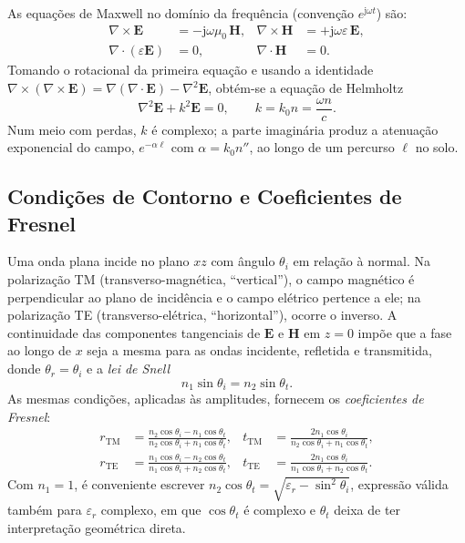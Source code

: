 \documentclass[12pt,a4paper,oneside]{book}
\theoremstyle{remark}
\newcommand{\vect}[1]{\boldsymbol{#1}}
\newcommand{\jj}{\mathrm{j}}
\theoremstyle{plain}
\theoremstyle{definition}
\begin{document}
As equações de Maxwell no domínio da frequência (convenção $e^{\jj\omega t}$)
são:
\begin{align}
  \nabla \times \vect{E} &= -\jj\omega\mu_0\,\vect{H}, \label{eq:maxwell_rot_e} &
  \nabla \times \vect{H} &= +\jj\omega\varepsilon\,\vect{E}, \\
  \nabla \cdot (\varepsilon\vect{E}) &= 0, \label{eq:maxwell_div_e} &
  \nabla \cdot \vect{H} &= 0 .
\end{align}
Tomando o rotacional da primeira equação e usando a identidade
$\nabla\times(\nabla\times\vect{E}) = \nabla(\nabla\cdot\vect{E}) - \nabla^2\vect{E}$,
obtém-se a equação de Helmholtz
\begin{equation}
  \nabla^2 \vect{E} + k^2 \vect{E} = 0, \qquad k = k_0 n = \frac{\omega n}{c}.
  \label{eq:helmholtz}
\end{equation}
Num meio com perdas, $k$ é complexo; a parte imaginária produz a atenuação
exponencial do campo, $e^{-\alpha\ell}$ com $\alpha = k_0 n''$, ao longo de um
percurso $\ell$ no solo.

\subsection{Condições de Contorno e Coeficientes de Fresnel}
\label{ssec:fresnel}

Uma onda plana incide no plano $xz$ com ângulo $\theta_i$ em relação à normal.
Na polarização TM (transverso-magnética, ``vertical''), o campo magnético é
perpendicular ao plano de incidência e o campo elétrico pertence a ele; na
polarização TE (transverso-elétrica, ``horizontal''), ocorre o inverso. A
continuidade das componentes tangenciais de $\vect E$ e $\vect H$ em $z=0$
impõe que a fase ao longo de $x$ seja a mesma para as ondas incidente, refletida
e transmitida, donde $\theta_r=\theta_i$ e a \emph{lei de Snell}
\begin{equation}
  \boxed{n_1\sin\theta_i = n_2\sin\theta_t}.
  \label{eq:snell}
\end{equation}
As mesmas condições, aplicadas às amplitudes, fornecem os
\emph{coeficientes de Fresnel}:
\begin{align}
  r_{\text{TM}} &= \frac{n_2\cos\theta_i - n_1\cos\theta_t}{n_2\cos\theta_i + n_1\cos\theta_t}, &
  t_{\text{TM}} &= \frac{2n_1\cos\theta_i}{n_2\cos\theta_i + n_1\cos\theta_t}, \label{eq:r_TM}\\
  r_{\text{TE}} &= \frac{n_1\cos\theta_i - n_2\cos\theta_t}{n_1\cos\theta_i + n_2\cos\theta_t}, &
  t_{\text{TE}} &= \frac{2n_1\cos\theta_i}{n_1\cos\theta_i + n_2\cos\theta_t}. \label{eq:r_TE}
\end{align}
Com $n_1=1$, é conveniente escrever $n_2\cos\theta_t=\sqrt{\varepsilon_r-\sin^2\theta_i}$,
expressão válida também para $\varepsilon_r$ complexo, em que $\cos\theta_t$ é
complexo e $\theta_t$ deixa de ter interpretação geométrica direta.
\end{document}
